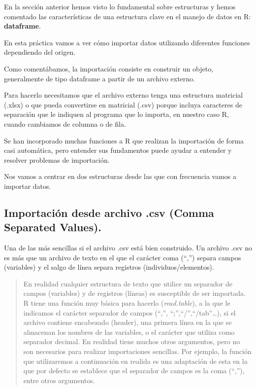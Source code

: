 \documentclass[
  letterpaper,
  DIV=11,
  numbers=noendperiod]{scrreprt}
\begin{document}
En la sección anterior hemos visto lo fundamental sobre estructuras y
hemos comentado las características de una estructura clave en el manejo
de datos en R: \textbf{dataframe}.

En esta práctica vamos a ver cómo importar datos utilizando diferentes
funciones dependiendo del origen.

Como comentábamos, la importación consiste en construir un objeto,
generalmente de tipo dataframe a partir de un archivo externo.

Para hacerlo necesitamos que el archivo externo tenga una estructura
matricial (.xlsx) o que pueda convertirse en matricial (.csv) porque
incluya caracteres de separación que le indiquen al programa que lo
importa, en nuestro caso R, cuando cambiamos de columna o de fila.

Se han incorporado muchas funciones a R que realizan la importación de
forma casi automática, pero entender sus fundamentos puede ayudar a
entender y resolver problemas de importación.

Nos vamos a centrar en dos estructuras desde las que con frecuencia
vamos a importar datos.

\hypertarget{importaciuxf3n-desde-archivo-.csv-comma-separated-values.}{%
\subsection{Importación desde archivo .csv (Comma Separated
Values).}\label{importaciuxf3n-desde-archivo-.csv-comma-separated-values.}}

Una de las más sencillas si el archivo .csv está bien construido. Un
archivo .csv no es más que un archivo de texto en el que el carácter
coma (``,'') separa campos (variables) y el salgo de línea separa
registros (individuos/elementos).

\begin{quote}
En realidad cualquier estructura de texto que utilice un separador de
campos (variables) y de registros (líneas) es susceptible de ser
importada. R tiene una función muy básica para hacerlo
(\emph{read.table}), a la que le indicamos el carácter separador de
campos (``,'', ``;'',``/'',``/tab''\ldots), si el archivo contiene
encabezado (header), una primera línea en la que se almacenan los
nombres de las variables, o el carácter que utiliza como separador
decimal. En realidad tiene muchos otros argumentos, pero no son
necesarios para realizar importaciones sencillas. Por ejemplo, la
función que utilizaremos a continuación en realida es una adaptación de
esta en la que por defecto se establece que el separador de campos es la
coma (``,''), entre otros argumentos.
\end{quote}
\end{document}
